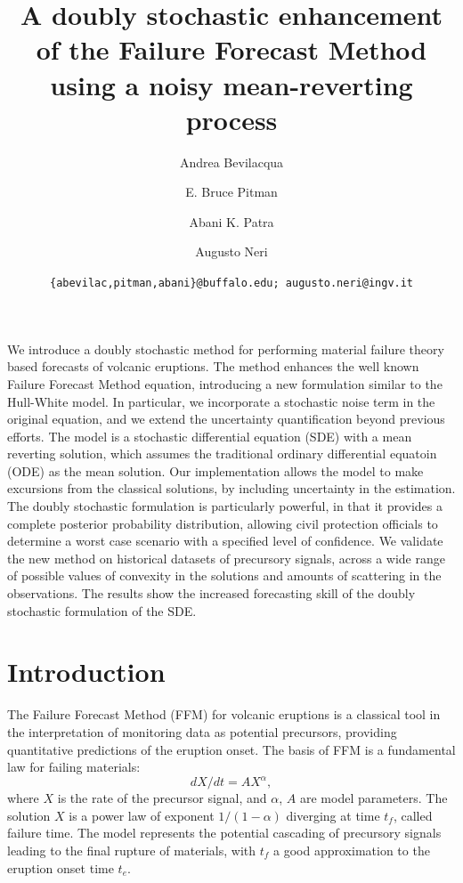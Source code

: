 \documentclass{article}
\begin{document}
\title{\bf A doubly stochastic enhancement of the Failure Forecast Method using a noisy mean-reverting process}
\author[1]{Andrea Bevilacqua}
\author[2]{E. Bruce Pitman}
\author[3,4]{Abani K. Patra}
\author[5]{Augusto Neri}


\date{\texttt{\{abevilac,pitman,abani\}@buffalo.edu; augusto.neri@ingv.it}}


\maketitle
\abstract
We introduce a doubly stochastic method for performing material failure theory based forecasts of volcanic eruptions. The method enhances the well known Failure Forecast Method equation, introducing a new formulation similar to the Hull-White model. In particular, we incorporate a stochastic noise term in the original equation, and we extend the uncertainty quantification beyond previous efforts. The model is a stochastic differential equation (SDE) with a mean reverting solution, which assumes the traditional ordinary differential equatoin (ODE) as the mean solution. Our implementation allows the model to make excursions from the classical solutions, by including uncertainty in the estimation. The doubly stochastic formulation is particularly powerful, in that it provides a complete posterior probability distribution, allowing civil protection officials to determine a worst case scenario with a specified level of confidence. We validate the new method on historical datasets of precursory signals, across a wide range of possible values of convexity in the solutions and amounts of scattering in the observations. The results show the increased forecasting skill of the doubly stochastic formulation of the SDE.

\tableofcontents

\section{Introduction}
The Failure Forecast Method (FFM) for volcanic eruptions is a classical tool in the interpretation of monitoring data as potential precursors, providing quantitative predictions of the eruption onset. The basis of FFM is a fundamental law for failing materials:
$$dX/dt=AX^\alpha,$$
where $X$ is the rate of the precursor signal, and $\alpha$, $A$ are model parameters. The solution $X$ is a power law of exponent $1/(1-\alpha)$ diverging at time $t_f$, called failure time. The model represents the potential cascading of precursory signals leading to the final rupture of materials, with $t_f$ a good approximation to the eruption onset time $t_e$.
\end{document}
